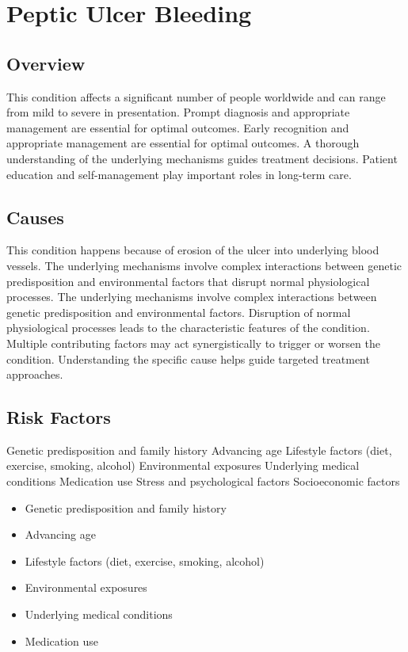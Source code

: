 \chapter{Peptic Ulcer Bleeding}
\label{sec:Peptic Ulcer Bleeding}

\section{Overview}
This condition affects a significant number of people worldwide and can range from mild to severe in presentation. Prompt diagnosis and appropriate management are essential for optimal outcomes. Early recognition and appropriate management are essential for optimal outcomes. A thorough understanding of the underlying mechanisms guides treatment decisions. Patient education and self-management play important roles in long-term care.
\section{Causes}
This condition happens because of erosion of the ulcer into underlying blood vessels. The underlying mechanisms involve complex interactions between genetic predisposition and environmental factors that disrupt normal physiological processes. The underlying mechanisms involve complex interactions between genetic predisposition and environmental factors. Disruption of normal physiological processes leads to the characteristic features of the condition. Multiple contributing factors may act synergistically to trigger or worsen the condition. Understanding the specific cause helps guide targeted treatment approaches.
\section{Risk Factors}
Genetic predisposition and family history Advancing age Lifestyle factors (diet, exercise, smoking, alcohol) Environmental exposures Underlying medical conditions Medication use Stress and psychological factors Socioeconomic factors

\begin{itemize}[noitemsep]
  \item Genetic predisposition and family history
  \item Advancing age
  \item Lifestyle factors (diet, exercise, smoking, alcohol)
  \item Environmental exposures
  \item Underlying medical conditions
  \item Medication use
\end{itemize}
